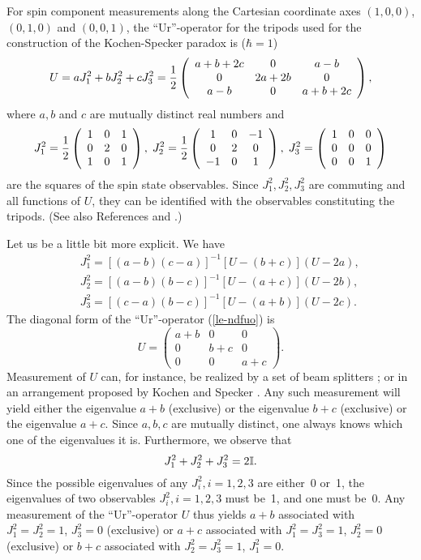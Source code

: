 \documentclass[%
  preprint,
 showpacs,
 showkeys,
 preprintnumbers,
 amsmath,amssymb,
 aps,
 rmp,
  longbibliography,
 ]{revtex4-1}
\begin{document}
For spin component measurements along the Cartesian coordinate axes
$(1,0,0)$, $(0,1,0)$ and $(0,0,1)$,
the ``Ur''-operator for the tripods used for the construction of the
Kochen-Specker paradox is ($\hbar = 1$)\cite{kochen1}
\begin{equation}
U=aJ_1^2+bJ_2^2+cJ_3^2=
 {1\over 2}
\left(
\begin{array}{ccc}
a+b+2c&0&a-b\\
0&2a+2b&0\\
a-b&0&a+b+2c
\end{array}
\right),
\label{le-ndfuo}
\end{equation}
where $a,b$ and $c$ are mutually distinct real numbers and
$$
J_1^2= {1\over 2}
\left(
\begin{array}{ccc}
1&0&1\\
0&2&0\\
1&0&1
\end{array}
\right), \;
J_2^2= {1\over 2}
\left(
\begin{array}{ccc}
1&0&-1\\
0&2&0\\
-1&0&1
\end{array}
\right), \;
J_3^2=
\left(
\begin{array}{ccc}
1&0&0\\
0&0&0\\
0&0&1\\
\end{array}
\right)
$$
are
the squares of the spin state observables.
Since $J_1^2,J_2^2,J_3^2$ are commuting and all functions of $U$,
they can be identified with the observables constituting the tripods.
(See also References
\cite[pp. 199-200]{peres} and
\cite{rzbb,swift80a}.)

Let us be a little bit more explicit. We have
\begin{eqnarray*}
&&J_1^2=[(a-b)(c-a)]^{-1}[U-(b+c)](U-2a),\\
&&J_2^2=[(a-b)(b-c)]^{-1}[U-(a+c)](U-2b),\\
&&J_3^2=[(c-a)(b-c)]^{-1}[U-(a+b)](U-2c).
\end{eqnarray*}
The diagonal form of the ``Ur''-operator (\ref{le-ndfuo}) is
$$
U=
\left(
\begin{array}{ccc}
a+b&0&0\\
0&b+c&0\\
0&0&a+c
\end{array}
\right).
$$
Measurement of $U$ can, for instance, be realized by a set of beam
splitters
\cite{rzbb}; or in an arrangement proposed by Kochen and Specker
\cite{kochen1}.
Any such measurement will yield either the eigenvalue
$a+b$  (exclusive) or the eigenvalue
$b+c$  (exclusive) or the eigenvalue
$a+c$. Since $a,b,c$ are mutually distinct, one always knows which one
of the eigenvalues it is. Furthermore, we observe that
$$J_1^2+J_2^2+J_3^2=2{\Bbb I}.$$
Since the possible eigenvalues of any $J_i^2, i=1,2,3$ are
either~0 or~1, the eigenvalues of two observables $J_i^2,i=1,2,3$ must
be~1, and one must be~0. Any measurement of the
``Ur''-operator $U$ thus yields
$a+b$ associated with $J_1^2=J_2^2=1$, $J_3^2=0$ (exclusive) or
$a+c$ associated with $J_1^2=J_3^2=1$, $J_2^2=0$ (exclusive) or
$b+c$ associated with $J_2^2=J_3^2=1$, $J_1^2=0$.
\end{document}
